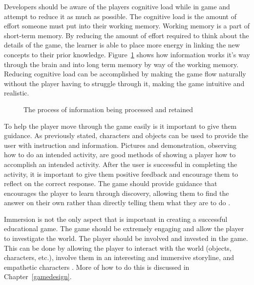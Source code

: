 Developers should be aware of the players cognitive load while in game and attempt to reduce it as much as possible. The cognitive load is the amount of effort someone must put into their working memory. Working memory is a part of short-term memory. By reducing the amount of effort required to think about the details of the game, the learner is able to place more energy in linking the new concepts to their prior knowledge. Figure~\ref{fig:MemoryandLearning} shows how information works it's way through the brain and into long term memory by way of the working memory. Reducing cognitive load can be accomplished by making the game flow naturally without the player having to struggle through it, making the game intuitive and realistic. 
\begin{figure}[!ht]
	\begin{center}
	\end{center}
	\caption{The process of information being processed and retained \cite{Tobias2014}} \label{fig:MemoryandLearning}
\end{figure} To help the player move through the game easily is it important to give them guidance. As previously stated, characters and objects can be used to provide the user with instruction and information. Pictures and demonstration, observing how to do an intended activity, are good methods of showing a player how to accomplish an intended activity. After the user is successful in completing the activity, it is important to give them positive feedback and encourage them to reflect on the correct response. The game should provide guidance that encourages the player to learn through discovery, allowing them to find the answer on their own rather than directly telling them what they are to do \cite{Tobias2014}. 


Immersion is not the only aspect that is important in creating a successful educational game. The game should be extremely engaging and allow the player to investigate the world. The player should be involved and invested in the game. This can be done by allowing the player to interact with the world (objects, characters, etc.), involve them in an interesting and immersive storyline, and empathetic characters \cite{Tobias2014}. More of how to do this is discussed in Chapter~\ref{gamedesign}.


